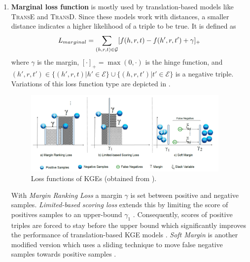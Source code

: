 \begin{enumerate}
    \item 
    \textbf{Marginal loss function} is mostly used by translation-based models like \textsc{TransE} and \textsc{TransD}.
    Since these models work with distances, a smaller distance indicates a higher likelihood of a triple to be true.
    It is defined as 
    \begin{equation}
        L_{marginal}=\sum_{(h,r,t)\in\mathcal{G}}[f(h,r,t)-f(h',r,t')+\gamma]_+\label{eq:marginalloss}
    \end{equation}
    where $\gamma$ is the margin, $[\cdot]_+=\max(0,\cdot)$ is the hinge function, and $(h',r,t')\in\{(h',r,t)|h'\in\mathcal{E}\}\cup\{(h,r,t')|t'\in\mathcal{E}\}$ is a negative triple.
    Variations of this loss function type are depicted in .
    \begin{figure}[t]
      \centering
        \includegraphics[width=0.95\textwidth]{figures/loss_functions.PNG}
      \caption{Loss functions of \acp{KGE} (obtained from \cite{9207513}).}
      \label{fig:loss_functions}
    \end{figure}
    With \textit{Margin Ranking Loss} a margin $\gamma$ is set between positive and negative samples.
    \textit{Limited-based scoring loss} extends this by limiting the score of positives samples to an upper-bound $\gamma_1$ \cite{9207513}.
    Consequently, scores of positive triples are forced to stay before the upper bound which
    significantly improves the performance of translation-based KGE models \cite{9207513}.
    \textit{Soft Margin} is another modified version which uses a sliding technique to move false negative samples towards positive samples \cite{9207513}. 
    

\end{enumerate}
